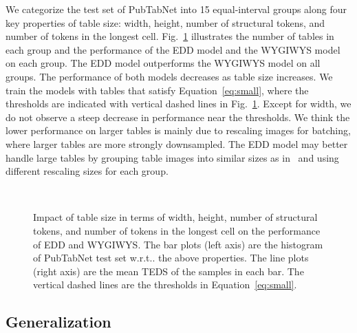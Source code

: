 \documentclass[conference]{IEEEtran}
\makeatletter
\DeclareRobustCommand\onedot{\futurelet\@let@token\@onedot}
\def\@onedot{\ifx\@let@token.\else.\null\fi\xspace}
\def\wrt{w.r.t\onedot} \def\dof{d.o.f\onedot}
\makeatother
\begin{document}
We categorize the test set of PubTabNet into 15 equal-interval groups along four
key properties of table size: width, height, number of structural tokens, and
number of tokens in the longest cell. Fig.~\ref{fig:error_analysis}
illustrates the number of tables in each group and the performance of the EDD
model and the WYGIWYS model on each group. The EDD model outperforms the WYGIWYS
model on all groups. The performance of both models decreases as table size
increases. We train the models with tables that satisfy Equation~\ref{eq:small},
where the thresholds are indicated with vertical dashed lines in
Fig.~\ref{fig:error_analysis}. Except for width, we do not observe a steep
decrease in performance near the thresholds. We think the lower performance on
larger tables is mainly due to rescaling images for batching, where larger
tables are more strongly downsampled. The EDD model may better handle large
tables by grouping table images into similar sizes as in~\cite{deng2017image}
and using different rescaling sizes for each group.

\begin{figure}[!ht]
  \centering
  \begin{minipage}[b]{.5\linewidth}\end{minipage}\begin{minipage}[b]{.5\linewidth}\end{minipage}\\
  \begin{minipage}[b]{.5\linewidth}\end{minipage}\begin{minipage}[b]{.5\linewidth}\end{minipage}
  \caption{Impact of table size in terms of width, height, number of structural
  tokens, and number of tokens in the longest cell on the performance of EDD and
  WYGIWYS. The bar plots (left axis) are the histogram of PubTabNet test set
  \wrt the above properties. The line plots (right axis) are the mean TEDS of
  the samples in each bar. The vertical dashed lines are the thresholds in
  Equation~\ref{eq:small}.}
  \label{fig:error_analysis}
\end{figure}


\subsection{Generalization}
\end{document}
